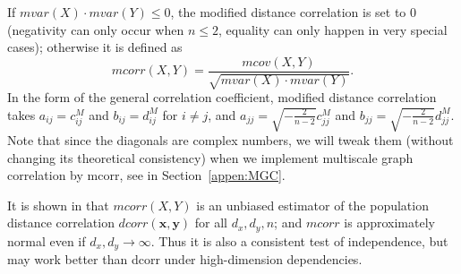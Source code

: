 \documentclass[11pt]{article}
\providecommand{\mb}[1]{\boldsymbol{#1}}
\begin{document}
If $mvar(X) \cdot mvar(Y) \leq 0$, the modified distance correlation is set to $0$ (negativity can only occur when $n\leq 2$, equality can only happen in very special cases); otherwise it is defined as
\begin{equation}
\label{mcorrEqu}
mcorr(X,Y)=\frac{mcov(X,Y)}{\sqrt{mvar(X) \cdot mvar(Y)}}.
\end{equation}
In the form of the general correlation coefficient, modified distance correlation takes $a_{ij}=c^{M}_{ij}$ and $b_{ij}=d^{M}_{ij}$ for $i \neq j$, and $a_{jj}=\sqrt{-\frac{2}{n-2}}c^{M}_{jj}$ and $b_{jj}=\sqrt{-\frac{2}{n-2}}d^{M}_{jj}$. Note that since the diagonals are complex numbers, we will tweak them (without changing its theoretical consistency) when we implement multiscale graph correlation by mcorr, see in Section~\ref{appen:MGC}.

It is shown in \cite{SzekelyRizzo2013a} that $mcorr(X,Y)$ is an unbiased estimator of the population distance correlation $dcorr(\mb{x},\mb{y})$ for all $d_{x}, d_{y}, n$; and $mcorr$ is approximately normal even if $d_{x},d_{y} \rightarrow \infty$. Thus it is also a consistent test of independence, but may work better than dcorr under high-dimension dependencies. 

\end{document}
